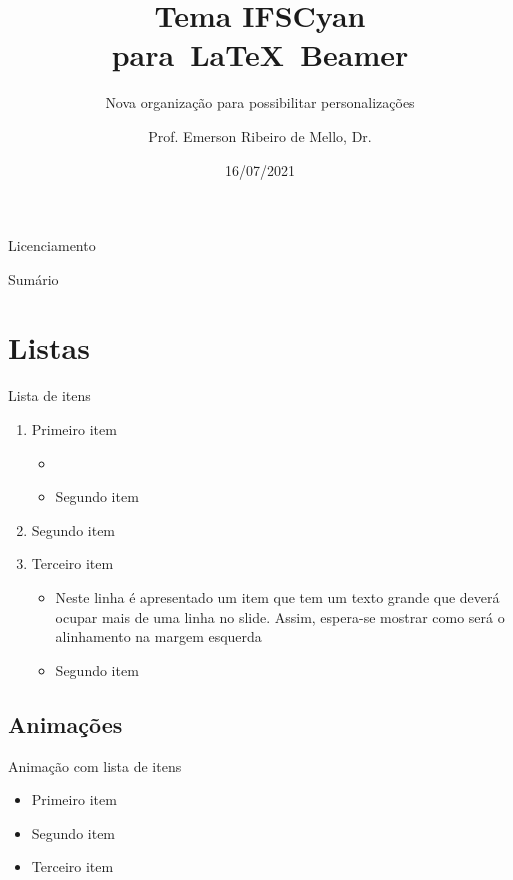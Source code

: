 \documentclass{beamer}
\title{Tema IFSCyan para~\LaTeX~Beamer}
\subtitle{Nova organização para possibilitar personalizações}
\author{Prof. Emerson Ribeiro de Mello, Dr.}
\institute{%
\url{mello@ifsc.edu.br}%
}%
\date{16/07/2021}
\begin{document}
\begin{frame}[plain]
    \titlepage
\end{frame}

\begin{frame}{Licenciamento}
    \licenciamentoLivre
\end{frame}

\begin{frame}{Sumário}
    \tableofcontents
\end{frame}



\section{Listas}


\begin{frame}{Lista de itens}
    \begin{enumerate}
        \item Primeiro item
        \begin{itemize}
            \item {}
            \item Segundo item
        \end{itemize}
        \item Segundo item
        \item Terceiro item 
        \begin{itemize}
            \item Neste linha é apresentado um item que tem um texto grande que deverá ocupar mais de uma linha no slide. Assim, espera-se mostrar como será o alinhamento na margem esquerda
            \item Segundo item
        \end{itemize}
    \end{enumerate}
\end{frame}

\subsection{Animações}

\begin{frame}{Animação com lista de itens}
\begin{itemize}[<+->]
    \item Primeiro item
    \item Segundo item
    \item Terceiro item
\end{itemize}
\end{frame}
\end{document}
